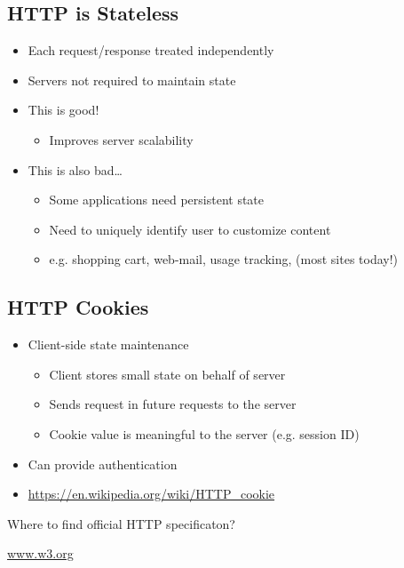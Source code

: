 \subsection{HTTP is Stateless}
\begin{itemize}[nosep]
    \item Each request/response treated independently
    \item Servers not required to maintain state
    \item This is good!
          \begin{itemize}[nosep]
              \item Improves server scalability
          \end{itemize}
    \item This is also bad\dots
          \begin{itemize}[nosep]
              \item Some applications need persistent state
              \item Need to uniquely identify user to customize content
              \item e.g. shopping cart, web-mail, usage tracking, (most sites today!)
          \end{itemize}
\end{itemize}
\subsection{HTTP Cookies}
\begin{itemize}
    \item Client-side state maintenance
          \begin{itemize}[nosep]
              \item Client stores small state on behalf of server
              \item Sends request in future requests to the server
              \item Cookie value is meaningful to the server (e.g. session ID)
          \end{itemize}
    \item Can provide authentication
    \item \url{https://en.wikipedia.org/wiki/HTTP_cookie}
\end{itemize}
Where to ﬁnd oﬃcial HTTP speciﬁcaton?

\url{www.w3.org}
